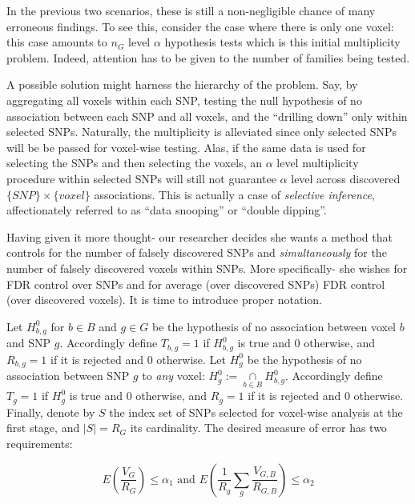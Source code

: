 \documentclass[draft,12pt]{article}
\begin{document}
In the previous two scenarios, these is still a non-negligible chance of many erroneous findings. To see this, consider the case where there is only one voxel: this case amounts to $n_G$ level $\alpha$ hypothesis tests which is this initial multiplicity problem. Indeed, attention has to be given to the number of families being tested. 

A possible solution might harness the hierarchy of the problem. Say, by aggregating all voxels within each SNP, testing the null hypothesis of no association between each SNP and all voxels, and the ``drilling down'' only within selected SNPs. Naturally, the multiplicity is alleviated since only selected SNPs will be be passed for voxel-wise testing. Alas, if the same data is used for selecting the SNPs and then selecting the voxels, an $\alpha$ level multiplicity procedure within selected SNPs will still not guarantee $\alpha$ level across discovered $\{SNP\} \times \{voxel\}$ associations. This is actually a case of \emph{selective inference}, affectionately  referred to as ``data snooping'' or ``double dipping''. 

Having given it more thought- our researcher decides she wants a method that controls for the number of falsely discovered SNPs and \emph{simultaneously} for the number of falsely discovered voxels within SNPs. More specifically- she wishes for FDR control over SNPs and for average (over discovered SNPs) FDR control (over discovered voxels). It is time to introduce proper notation.


Let $H^0_{b,g}$ for $b \in B$ and $g \in G$ be the hypothesis of no association between voxel $b$ and SNP $g$. 
Accordingly define $T_{b,g}=1$ if $H^0_{b,g}$ is true and 0 otherwise, and $R_{b,g}=1$ if it is rejected and 0 otherwise. Let $H^0_g$ be the hypothesis of no association between SNP $g$ to \emph{any} voxel: $ H^0_g:= \underset{b\in B}{\cap} H^0_{b,g}$.  
Accordingly define $T_{g}=1$ if $H^0_{g}$ is true and 0 otherwise, and $R_{g}=1$ if it is rejected and 0 otherwise. 
Finally, denote by $S$ the index set of SNPs selected for voxel-wise analysis at the first stage, and $\left| S \right|=R_G$ its cardinality. The desired measure of error has two requirements: 


\begin{equation} \label{eq:hirarchial_error}
 E \left(\frac{V_G}{R_G} \right)\leq \alpha_1 
\text{ and } 
E \left( \frac{1}{R_g}\sum_{g} \frac{V_{G,B}}{R_{G,B}} \right)\leq \alpha_2
\end{equation}
\end{document}
